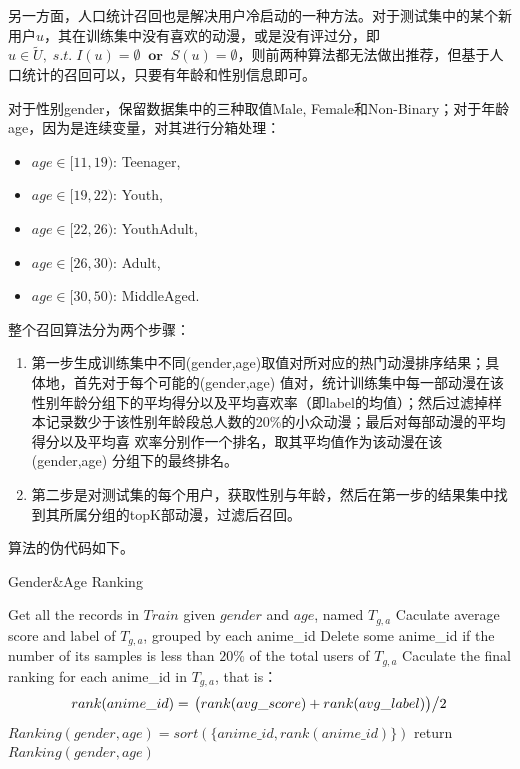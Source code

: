       另一方面，人口统计召回也是解决用户冷启动的一种方法。对于测试集中的某个新用户$u$，其在训练集中没有喜欢的动漫，或是没有评过分，即$u\in\tilde{U},\;s.t.\;I(u)=\emptyset\;\;\textbf{or}\;\;S(u)=\emptyset$，则前两种算法都无法做出推荐，但基于人口统计的召回可以，只要有年龄和性别信息即可。

      对于性别gender，保留数据集中的三种取值Male, Female和Non-Binary；对于年龄age，因为是连续变量，对其进行分箱处理：
      \begin{itemize}
        \item $age\in[11,19)$: Teenager,
        \item $age\in[19,22)$: Youth,
        \item $age\in[22,26)$: YouthAdult,
        \item $age\in[26,30)$: Adult,
        \item $age\in[30,50)$: MiddleAged.
      \end{itemize}
      整个召回算法分为两个步骤：
      \begin{enumerate}
        \item 第一步生成训练集中不同(gender,age)取值对所对应的热门动漫排序结果；具体地，首先对于每个可能的(gender,age) 值对，统计训练集中每一部动漫在该性别年龄分组下的平均得分以及平均喜欢率（即label的均值）；然后过滤掉样本记录数少于该性别年龄段总人数的20\%的小众动漫；最后对每部动漫的平均得分以及平均喜 欢率分别作一个排名，取其平均值作为该动漫在该 (gender,age) 分组下的最终排名。
        \item 第二步是对测试集的每个用户，获取性别与年龄，然后在第一步的结果集中找到其所属分组的topK部动漫，过滤后召回。
      \end{enumerate}
      算法的伪代码如下。
      \begin{algorithm}[htbp]
        \caption{Gender\&Age Ranking}
        Get all the records in $Train$ given $gender$ and $age$, named $T_{g,a}$\;
        Caculate average score and label of $T_{g,a}$, grouped by each anime\_id\;
        Delete some anime\_id if the number of its samples is less than $20\%$ of the total users of $T_{g,a}$\;
        Caculate the final ranking for each anime\_id in $T_{g,a}$, that is：
        $$rank(anime\_id) = \left.\big(rank(avg\_score)+rank(avg\_label)\big)\middle/2\right.$$\;
        $Ranking(gender,age) = sort(\{anime\_id,rank(anime\_id)\})$\;
        return $Ranking(gender,age)$\;
      \end{algorithm}

